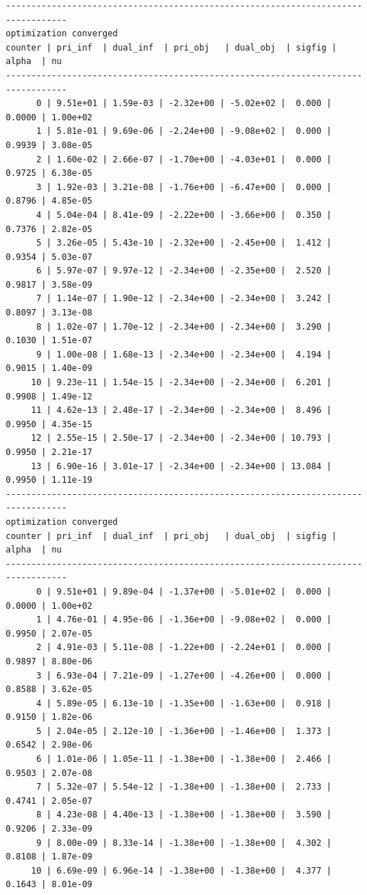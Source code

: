 \documentclass[
]{book}
\begin{document}
\begin{verbatim}
----------------------------------------------------------------------------------
optimization converged
counter | pri_inf  | dual_inf  | pri_obj   | dual_obj  | sigfig | alpha  | nu 
----------------------------------------------------------------------------------
      0 | 9.51e+01 | 1.59e-03 | -2.32e+00 | -5.02e+02 |  0.000 | 0.0000 | 1.00e+02
      1 | 5.81e-01 | 9.69e-06 | -2.24e+00 | -9.08e+02 |  0.000 | 0.9939 | 3.08e-05
      2 | 1.60e-02 | 2.66e-07 | -1.70e+00 | -4.03e+01 |  0.000 | 0.9725 | 6.38e-05
      3 | 1.92e-03 | 3.21e-08 | -1.76e+00 | -6.47e+00 |  0.000 | 0.8796 | 4.85e-05
      4 | 5.04e-04 | 8.41e-09 | -2.22e+00 | -3.66e+00 |  0.350 | 0.7376 | 2.82e-05
      5 | 3.26e-05 | 5.43e-10 | -2.32e+00 | -2.45e+00 |  1.412 | 0.9354 | 5.03e-07
      6 | 5.97e-07 | 9.97e-12 | -2.34e+00 | -2.35e+00 |  2.520 | 0.9817 | 3.58e-09
      7 | 1.14e-07 | 1.90e-12 | -2.34e+00 | -2.34e+00 |  3.242 | 0.8097 | 3.13e-08
      8 | 1.02e-07 | 1.70e-12 | -2.34e+00 | -2.34e+00 |  3.290 | 0.1030 | 1.51e-07
      9 | 1.00e-08 | 1.68e-13 | -2.34e+00 | -2.34e+00 |  4.194 | 0.9015 | 1.40e-09
     10 | 9.23e-11 | 1.54e-15 | -2.34e+00 | -2.34e+00 |  6.201 | 0.9908 | 1.49e-12
     11 | 4.62e-13 | 2.48e-17 | -2.34e+00 | -2.34e+00 |  8.496 | 0.9950 | 4.35e-15
     12 | 2.55e-15 | 2.50e-17 | -2.34e+00 | -2.34e+00 | 10.793 | 0.9950 | 2.21e-17
     13 | 6.90e-16 | 3.01e-17 | -2.34e+00 | -2.34e+00 | 13.084 | 0.9950 | 1.11e-19
----------------------------------------------------------------------------------
optimization converged
counter | pri_inf  | dual_inf  | pri_obj   | dual_obj  | sigfig | alpha  | nu 
----------------------------------------------------------------------------------
      0 | 9.51e+01 | 9.89e-04 | -1.37e+00 | -5.01e+02 |  0.000 | 0.0000 | 1.00e+02
      1 | 4.76e-01 | 4.95e-06 | -1.36e+00 | -9.08e+02 |  0.000 | 0.9950 | 2.07e-05
      2 | 4.91e-03 | 5.11e-08 | -1.22e+00 | -2.24e+01 |  0.000 | 0.9897 | 8.80e-06
      3 | 6.93e-04 | 7.21e-09 | -1.27e+00 | -4.26e+00 |  0.000 | 0.8588 | 3.62e-05
      4 | 5.89e-05 | 6.13e-10 | -1.35e+00 | -1.63e+00 |  0.918 | 0.9150 | 1.82e-06
      5 | 2.04e-05 | 2.12e-10 | -1.36e+00 | -1.46e+00 |  1.373 | 0.6542 | 2.98e-06
      6 | 1.01e-06 | 1.05e-11 | -1.38e+00 | -1.38e+00 |  2.466 | 0.9503 | 2.07e-08
      7 | 5.32e-07 | 5.54e-12 | -1.38e+00 | -1.38e+00 |  2.733 | 0.4741 | 2.05e-07
      8 | 4.23e-08 | 4.40e-13 | -1.38e+00 | -1.38e+00 |  3.590 | 0.9206 | 2.33e-09
      9 | 8.00e-09 | 8.33e-14 | -1.38e+00 | -1.38e+00 |  4.302 | 0.8108 | 1.87e-09
     10 | 6.69e-09 | 6.96e-14 | -1.38e+00 | -1.38e+00 |  4.377 | 0.1643 | 8.01e-09

\end{verbatim}
\end{document}
